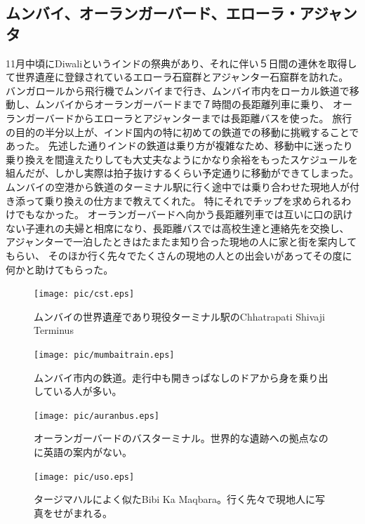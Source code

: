 \subsection{ムンバイ、オーランガーバード、エローラ・アジャンタ}
11月中頃にDiwaliというインドの祭典があり、それに伴い５日間の連休を取得して世界遺産に登録されているエローラ石窟群とアジャンター石窟群を訪れた。
バンガロールから飛行機でムンバイまで行き、ムンバイ市内をローカル鉄道で移動し、ムンバイからオーランガーバードまで７時間の長距離列車に乗り、
オーランガーバードからエローラとアジャンターまでは長距離バスを使った。
旅行の目的の半分以上が、インド国内の特に初めての鉄道での移動に挑戦することであった。
先述した通りインドの鉄道は乗り方が複雑なため、移動中に迷ったり乗り換えを間違えたりしても大丈夫なようにかなり余裕をもったスケジュールを組んだが、しかし実際は拍子抜けするくらい予定通りに移動ができてしまった。
ムンバイの空港から鉄道のターミナル駅に行く途中では乗り合わせた現地人が付き添って乗り換えの仕方まで教えてくれた。
特にそれでチップを求められるわけでもなかった。
オーランガーバードへ向かう長距離列車では互いに口の訊けない子連れの夫婦と相席になり、長距離バスでは高校生達と連絡先を交換し、
アジャンターで一泊したときはたまたま知り合った現地の人に家と街を案内してもらい、
そのほか行く先々でたくさんの現地の人との出会いがあってその度に何かと助けてもらった。
\begin{figure}[H]
  \begin{minipage}{0.5\hsize}
  \begin{center}
    \texttt{[image: pic/cst.eps]}
  \end{center}
  \caption{ムンバイの世界遺産であり現役ターミナル駅のChhatrapati Shivaji Terminus}
  \end{minipage}
  \begin{minipage}{0.5\hsize}
  \begin{center}
    \texttt{[image: pic/mumbaitrain.eps]}
  \end{center}
  \caption{ムンバイ市内の鉄道。走行中も開きっぱなしのドアから身を乗り出している人が多い。}
  \end{minipage}
\end{figure}
\begin{figure}[H]
  \begin{minipage}{0.5\hsize}
  \begin{center}
    \texttt{[image: pic/auranbus.eps]}
  \end{center}
  \caption{オーランガーバードのバスターミナル。世界的な遺跡への拠点なのに英語の案内がない。}
  \end{minipage}
  \begin{minipage}{0.5\hsize}
  \begin{center}
    \texttt{[image: pic/uso.eps]}
  \end{center}
  \caption{タージマハルによく似たBibi Ka Maqbara。行く先々で現地人に写真をせがまれる。}
  \end{minipage}
\end{figure}
